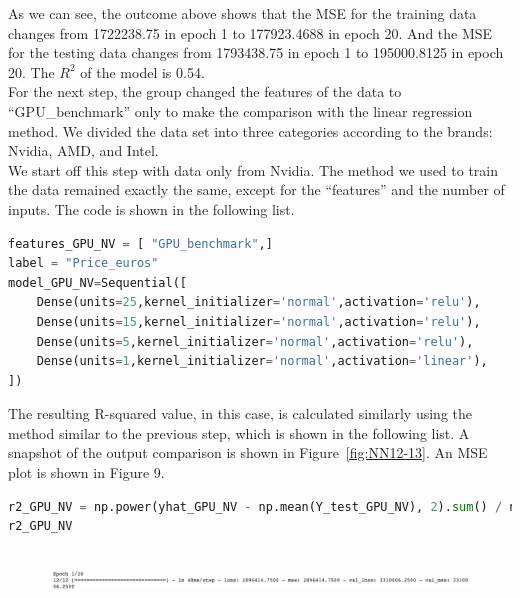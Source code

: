 \documentclass{scrartcl}
\begin{document}
\noindent As we can see, the outcome above shows that the MSE for the training data changes from 1722238.75 in epoch 1 to 177923.4688 in epoch 20. And the MSE for the testing data changes from 1793438.75 in epoch 1 to 195000.8125 in epoch 20. The $R^2$ of the model is 0.54.\\







\noindent For the next step, the group changed the features of the data to “GPU\_benchmark” only to make the comparison with the linear regression method. We divided the data set into three categories according to the brands: Nvidia, AMD, and Intel. \\

\noindent We start off this step with data only from Nvidia. The method we used to train the data remained exactly the same, except for the “features” and the number of inputs. The code is shown in the following list. \\

\begin{lstlisting}[language=Python, caption= Code for training Nvidia data, basicstyle=\tiny,captionpos=b]
features_GPU_NV = [ "GPU_benchmark",]
label = "Price_euros"
model_GPU_NV=Sequential([
    Dense(units=25,kernel_initializer='normal',activation='relu'),
    Dense(units=15,kernel_initializer='normal',activation='relu'),
    Dense(units=5,kernel_initializer='normal',activation='relu'),
    Dense(units=1,kernel_initializer='normal',activation='linear'),
])

\end{lstlisting}


\noindent The resulting R-squared value, in this case, is calculated similarly using the method similar to the previous step, which is shown in the following list. A snapshot of the output comparison is shown in Figure~\ref{fig:NN12-13}. An MSE plot is shown in Figure 9. \\

\begin{lstlisting}[language=Python, caption= Code output for MSE Nvidia training, basicstyle=\tiny,captionpos=b]
r2_GPU_NV = np.power(yhat_GPU_NV - np.mean(Y_test_GPU_NV), 2).sum() / np.power(Y_test_GPU_NV - np.mean(Y_test_GPU_NV), 2).sum()
r2_GPU_NV
    
\end{lstlisting}


\begin{figure}
         \centering
         \includegraphics[width=\textwidth]{Graphics/Neural Network Images/NN12.png}
\end{figure}
     
\end{document}

